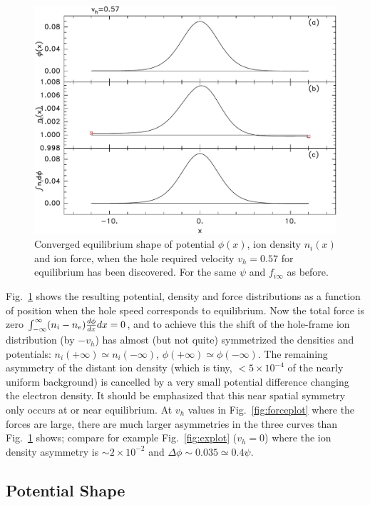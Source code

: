 \documentclass[pre]{revtex4-2}
\begin{document}
\begin{figure}[htp]
  \centering
  \includegraphics[width=0.7\hsize]{convplot}
  \caption{Converged equilibrium shape of potential $\phi(x)$, ion
    density $n_i(x)$ and ion force, when the hole required velocity
    $v_h=0.57$ for equilibrium has been discovered. For the same
    $\psi$ and $f_{i\infty}$ as before.}
  \label{fig:convplot}
\end{figure}
Fig.\ \ref{fig:convplot} shows the resulting potential, density and
force distributions as a function of position when the hole speed
corresponds to equilibrium. Now the total force is zero
$\int_{-\infty}^\infty (n_i-n_e){d\phi\over dx} dx=0$, and to achieve this the shift of
the hole-frame ion distribution (by $-v_h$) has almost (but not quite)
symmetrized the densities and potentials:
$n_i(+\infty)\simeq n_i(-\infty)$,
$\phi(+\infty)\simeq \phi(-\infty)$. The remaining asymmetry of the
distant ion density (which is tiny, $<5\times10^{-4}$ of the nearly uniform
background) is cancelled by a very small potential difference
changing the electron density. It should be emphasized that this near
spatial symmetry only occurs at or near equilibrium. At $v_h$ values
in Fig.\ \ref{fig:forceplot} where the forces are large, there are
much larger asymmetries in the three curves than Fig.\ \ref{fig:convplot}
shows; compare for example Fig.\ \ref{fig:explot} ($v_h=0$) where
the ion density asymmetry is $\sim 2\times10^{-2}$ and $\Delta\phi\sim
0.035\simeq 0.4\psi$.



\subsection{Potential Shape}
\end{document}
